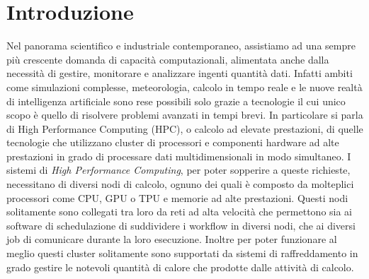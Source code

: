 \chapter{Introduzione}
Nel panorama scientifico e industriale contemporaneo, assistiamo ad una sempre più crescente domanda di capacità computazionali, alimentata anche dalla necessità di gestire, monitorare e analizzare ingenti quantità dati. Infatti ambiti come simulazioni complesse, meteorologia, calcolo in tempo reale e le nuove realtà di intelligenza artificiale sono rese possibili solo grazie a tecnologie il cui unico scopo è quello di risolvere problemi avanzati in tempi brevi. In particolare si parla di High Performance Computing (HPC), o calcolo ad elevate prestazioni, di quelle tecnologie che utilizzano cluster di processori e componenti hardware ad alte prestazioni in grado di processare dati multidimensionali in modo simultaneo.
I sistemi di \emph{High Performance Computing}, per poter sopperire a queste richieste, necessitano di diversi nodi di calcolo, ognuno dei quali è composto da molteplici processori come CPU, GPU o TPU e memorie ad alte prestazioni. Questi nodi solitamente sono collegati tra loro da reti ad alta velocità che permettono sia ai software di schedulazione di suddividere i workflow in diversi nodi, che ai diversi job di comunicare durante la loro esecuzione. Inoltre per poter funzionare al meglio questi cluster solitamente sono supportati da sistemi di raffreddamento in grado gestire le notevoli quantità di calore che prodotte dalle attività di calcolo. 

